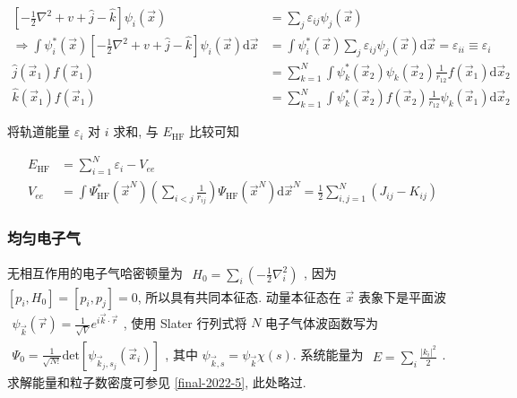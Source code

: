 \documentclass[../../main.tex]{subfiles}
\begin{document}
\begin{align*}
  \left[-\frac{1}{2}\nabla^{2} + v + \hat{j}-\hat{k}\right]\psi_{i}(\vec{x}) &= \sum_{j}\varepsilon_{ij}\psi_{j}(\vec{x})\\
  \Rightarrow \int\psi_{i}^{*}(\vec{x})\left[-\frac{1}{2}\nabla^{2} + v + \hat{j}-\hat{k}\right]\psi_{i}(\vec{x})\mathrm{d}\vec{x} &= \int\psi_{i}^{*}(\vec{x})\sum_{j}\varepsilon_{ij}\psi_{j}(\vec{x})\mathrm{d}\vec{x} = \varepsilon_{ii}\equiv \varepsilon_{i}\\
  \hat{j}(\vec{x}_{1})f(\vec{x}_{1}) &= \sum_{k = 1}^{N}\int\psi_{k}^{*}(\vec{x}_{2})\psi_{k}(\vec{x}_{2})\frac{1}{r_{12}}f(\vec{x}_{1})\mathrm{d}\vec{x}_{2}\\
  \hat{k}(\vec{x}_{1})f(\vec{x}_{1}) &= \sum_{k = 1}^{N}\int\psi_{k}^{*}(\vec{x}_{2})f(\vec{x}_{2})\frac{1}{r_{12}}\psi_{k}(\vec{x}_{1})\mathrm{d}\vec{x}_{2}
\end{align*}

将轨道能量 $\varepsilon_{i}$ 对 $i$ 求和, 与 $E_{\text{HF}}$ 比较可知

\begin{align*}
  E_{\text{HF}} &= \sum_{i=1}^{N}\varepsilon_{i} - V_{ee}\\
  V_{ee} &= \int\Psi_{\text{HF}}^{*}(\vec{x}^{N})\left(\sum_{i < j}\frac{1}{r_{ij}}\right)\Psi_{\text{HF}}(\vec{x}^{N})\mathrm{d}\vec{x}^{N} = \frac{1}{2}\sum_{i,j=1}^{N}(J_{ij}-K_{ij})
\end{align*}
\subsubsection{均匀电子气}
无相互作用的电子气哈密顿量为 $\begin{aligned}
  H_{0} = \sum_{i}\left(-\frac{1}{2}\nabla_{i}^{2}\right)
\end{aligned}$, 因为 $[p_{i},H_{0}] = [p_{i},p_{j}] = 0$, 所以具有共同本征态. 动量本征态在 $\vec{x}$ 表象下是平面波 $\begin{aligned}
  \psi_{\vec{k}}(\vec{r}) = \frac{1}{\sqrt{V}}e^{i\vec{k}\cdot\vec{r}}
\end{aligned}$, 使用 Slater 行列式将 $N$ 电子气体波函数写为 $\begin{aligned}
  \Psi_{0} = \frac{1}{\sqrt{N!}}\text{det}[\psi_{\vec{k}_{j},s_{j}}(\vec{x}_{i})]
\end{aligned}$, 其中 $\psi_{\vec{k},s} = \psi_{\vec{k}}\chi(s)$. 系统能量为 $\begin{aligned}
  E = \sum_{i}\frac{|k_{i}|^{2}}{2}
\end{aligned}$. 求解能量和粒子数密度可参见 \ref{final-2022-5}, 此处略过.
\end{document}
